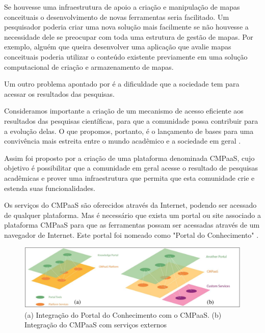 \documentclass[
	12pt,				%
	openright,			%
	oneside,			%
	a4paper,			%
	english,			%
	french,				%
	spanish,			%
	brazil				%
	]{abntex2}
\begin{document}
Se houvesse uma infraestrutura de apoio a criação e manipulação de mapas conceituais o desenvolvimento de novas ferramentas seria facilitado. Um pesquisador poderia criar uma nova solução mais facilmente se não houvesse a necessidade dele se preocupar com toda uma estrutura de gestão de mapas. Por exemplo, alguém que queira desenvolver uma aplicação que avalie mapas conceituais poderia utilizar o conteúdo existente previamente em uma solução computacional de criação e armazenamento de mapas.

Um outro problema apontado por  é a dificuldade que a sociedade tem para acessar os resultados das pesquisas.
\begin{citacao}
	Consideramos importante a criação de um mecanismo de
	acesso eficiente aos resultados das pesquisas científicas, para que a comunidade possa contribuir para a evolução delas. O que propomos, portanto, é o lançamento de bases para uma convivência mais estreita entre o mundo acadêmico e a sociedade em geral \cite{Perin2014}.
\end{citacao}

Assim foi proposto por  a criação de uma plataforma denominada CMPaaS, cujo objetivo é possibilitar que a comunidade em geral acesse o resultado de pesquisas acadêmicas e prover uma infraestrutura que permita que esta comunidade crie e estenda suas funcionalidades.

Os serviços do CMPaaS são oferecidos através da Internet, podendo ser acessado de qualquer plataforma. Mas é necessário que exista um portal ou site associado a plataforma CMPaaS para que as ferramentas possam ser acessadas através de um navegador de Internet. Este portal foi nomeado como "Portal do Conhecimento" \cite{Perin2014}. 


\begin{figure}[htb]
	\caption{\label{fig_cmpaas}(a) Integração do Portal do Conhecimento com o CMPaaS. (b) Integração do CMPaaS com serviços externos}
	\begin{center}
		\includegraphics[scale=0.3]{cmpaas.png}
	\end{center}
\end{figure}
\end{document}
